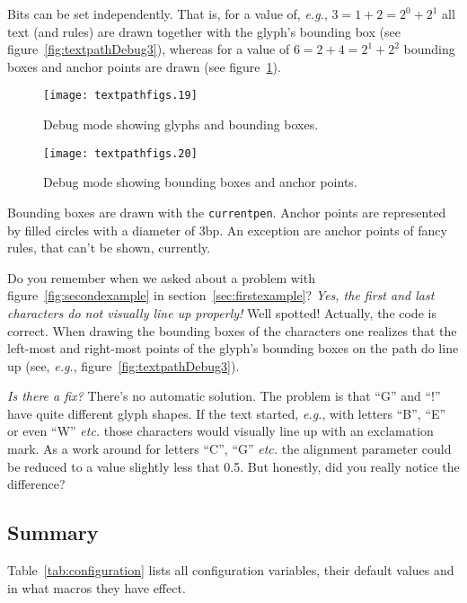 \documentclass{article}
\newcommand*{\cmd}[1]{\texttt{#1}}
\newcommand{\user}[1]{\emph{#1}}
\begin{document}
Bits can be set independently.  That is, for a value of, \emph{e.g.}, $3=1+2=2^0+2^1$ all text (and rules) are drawn together with the glyph's bounding box (see figure~\ref{fig:textpathDebug3}), whereas for a value of $6=2+4=2^1+2^2$ bounding boxes and anchor points are drawn (see figure~\ref{fig:textpathDebug6}).

\begin{figure}%
\begin{minipage}[t]{.45\linewidth}
  \centering
  \texttt{[image: textpathfigs.19]}
  \caption{Debug mode showing glyphs and bounding boxes.}
  \label{fig:textpathDebug3}
\end{minipage}\hfill
\begin{minipage}[t]{.45\linewidth}
  \centering
  \texttt{[image: textpathfigs.20]}
  \caption{Debug mode showing bounding boxes and anchor points.}
  \label{fig:textpathDebug6}
\end{minipage}
\end{figure}

Bounding boxes are drawn with the \cmd{currentpen}.  Anchor points are represented by filled circles with a diameter of 3bp.  An exception are anchor points of fancy rules, that can't be shown, currently.

Do you remember when we asked about a problem with figure~\ref{fig:secondexample} in section~\ref{sec:firstexample}?  \user{Yes, the first and last characters do not visually line up properly!} Well spotted!  Actually, the code is correct.  When drawing the bounding boxes of the characters one realizes that the left-most and right-most points of the glyph's bounding boxes on the path do line up (see, \emph{e.g.}, figure~\ref{fig:textpathDebug3}).

\user{Is there a fix?}  There's no automatic solution.  The problem is that ``G'' and ``!'' have quite different glyph shapes.  If the text started, \emph{e.g.}, with letters ``B'', ``E'' or even ``W'' \emph{etc.\@} those characters would visually line up with an exclamation mark.  As a work around for letters ``C'', ``G'' \emph{etc.\@} the alignment parameter could be reduced to a value slightly less that 0.5.  But honestly, did you really notice the difference?



\subsection{Summary}
Table~\ref{tab:configuration} lists all configuration variables, their default values and in what macros they have effect.
\end{document}
